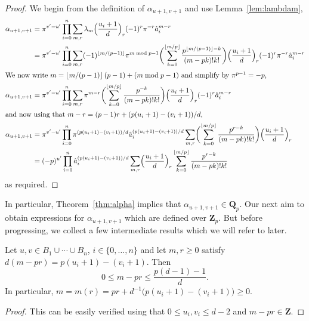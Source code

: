 \begin{proof}
We begin from the definition of $\alpha_{u+1,v+1}$ 
and use Lemma~\ref{lem:lambdam},
\begin{align*}
\alpha_{u+1,v+1} 
    & = \pi^{v'-u'} \prod_{i=0}^n \sum_{m,r} \lambda_m \Bigl( \frac{u_i+1}{d} \Bigr)_r (-1)^r \pi^{-r} \hat{a}_i^{m-r} \\
    & = \pi^{v'-u'} \prod_{i=0}^n \sum_{m,r} (-1)^{\left\lfloor m/(p-1)\right\rfloor} \pi^{m \bmod{p-1}} \biggl( \sum_{k=0}^{\left\lfloor m/p\right\rfloor} \frac{p^{\left\lfloor m/(p-1)\right\rfloor-k}}{(m-pk)!k!} \biggr) \Bigl( \frac{u_i+1}{d} \Bigr)_r (-1)^r \pi^{-r} \hat{a}_i^{m-r} \\
\intertext{We now write $m = \left\lfloor m/(p-1)\right\rfloor (p-1) + (m \bmod{p-1})$ and simplify by $\pi^{p-1} = -p$,}
\alpha_{u+1,v+1}
    & = \pi^{v'-u'} \prod_{i=0}^n \sum_{m,r} \pi^{m - r} \biggl( \sum_{k=0}^{\left\lfloor m/p\right\rfloor} \frac{p^{-k}}{(m-pk)!k!} \biggr) \Bigl( \frac{u_i+1}{d} \Bigr)_r (-1)^r \hat{a}_i^{m-r} \\
\intertext{and now using that $m-r = (p-1)r + (p(u_i+1) - (v_i+1))/d$,}
\alpha_{u+1,v+1}
    & = \pi^{v'-u'} \prod_{i=0}^n \pi^{(p (u_i + 1) - (v_i + 1))/d} \hat{a}_i^{(p (u_i + 1) - (v_i + 1))/d} \sum_{m,r} \biggl( \sum_{k=0}^{\left\lfloor m/p\right\rfloor} \frac{p^{r-k}}{(m-pk)!k!} \biggr) \Bigl( \frac{u_i+1}{d} \Bigr)_r \\
    & = (-p)^{u'} \prod_{i=0}^n \hat{a}_i^{(p (u_i + 1) - (v_i + 1))/d} \sum_{m,r} \Bigl( \frac{u_i+1}{d} \Bigr)_r \sum_{k=0}^{\left\lfloor m/p\right\rfloor} \frac{p^{r-k}}{(m-pk)!k!}
\end{align*}
as required.
\end{proof}

In particular, Theorem~\ref{thm:alpha} implies that 
$\alpha_{u+1, v+1} \in \mathbf{Q}_p$.  Our next aim to obtain 
expressions for $\alpha_{u+1,v+1}$ which are defined over 
$\mathbf{Z}_p$.  But before progressing, we collect a few 
intermediate results which we will refer to later.

\begin{prop} \label{prop:mpr1}
Let $u, v \in B_1 \cup \dotsb \cup B_n$, $i \in \{0,\dotsc,n\}$ and 
let $m, r \geq 0$ satisfy $d(m-pr) = p(u_i + 1) - (v_i + 1)$.  Then 
\begin{equation*}
0 \leq m - p r \leq \frac{p(d-1)-1}{d}.
\end{equation*}
In particular, $m = m(r) = pr + d^{-1}\bigl(p(u_i+1)-(v_i+1)\bigr) \geq 0$.
\end{prop}

\begin{proof}
This can be easily verified using that $0 \leq u_i, v_i \leq d - 2$ 
and $m - pr \in \mathbf{Z}$.
\end{proof}

